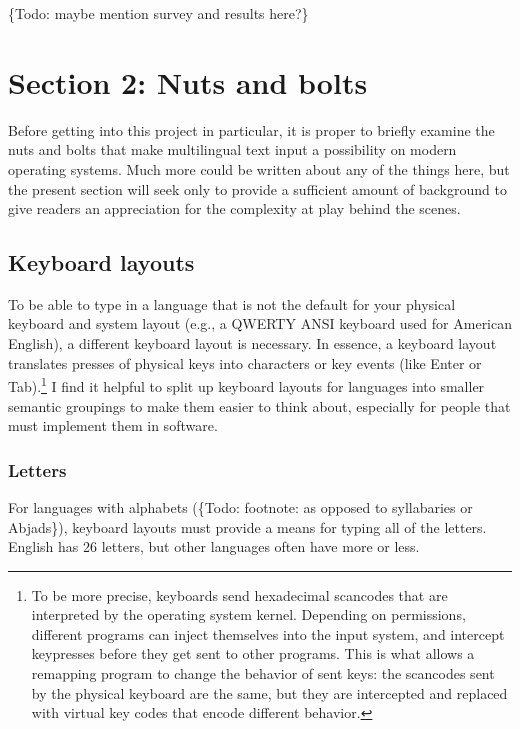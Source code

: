 \documentclass[11pt]{article}
\begin{document}
\{Todo: maybe mention survey and results here?\}

\section{Section 2: Nuts and bolts}
\label{sec:org2f0e0b4}

Before getting into this project in particular, it is proper to briefly examine the nuts and bolts that make multilingual text input a possibility on modern operating systems. Much more could be written about any of the things here, but the present section will seek only to provide a sufficient amount of background to give readers an appreciation for the complexity at play behind the scenes.

\subsection{Keyboard layouts}
\label{sec:org199bd7e}

To be able to type in a language that is not the default for your physical keyboard and system layout (e.g., a QWERTY ANSI keyboard used for American English), a different keyboard layout is necessary. In essence, a keyboard layout translates presses of physical keys into characters or key events (like Enter or Tab).\footnote{To be more precise, keyboards send hexadecimal scancodes that are interpreted by the operating system kernel. Depending on permissions, different programs can inject themselves into the input system, and intercept keypresses before they get sent to other programs. This is what allows a remapping program to change the behavior of sent keys: the scancodes sent by the physical keyboard are the same, but they are intercepted and replaced with virtual key codes that encode different behavior.} I find it helpful to split up keyboard layouts for languages into smaller semantic groupings to make them easier to think about, especially for people that must implement them in software.

\subsubsection{Letters}
\label{sec:orgda98ad9}

For languages with alphabets (\{Todo: footnote: as opposed to syllabaries or Abjads\}), keyboard layouts must provide a means for typing all of the letters. English has 26 letters, but other languages often have more or less.
\end{document}
